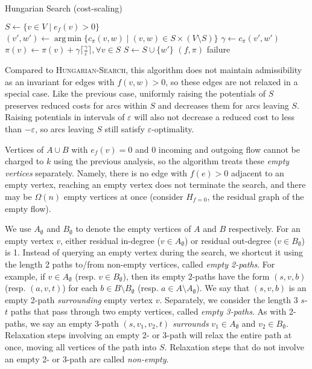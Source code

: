 \documentclass[11pt]{article}
\def\eps{\varepsilon}
\DeclareMathOperator*{\argmin}{arg\,min}
\theoremstyle{plain}
\begin{document}
\begin{algorithm}
\caption{Hungarian Search (cost-scaling)}
\begin{algorithmic}[1]
	\State $S \gets \{v \in V \mid e_f(v) > 0\}$
	\Repeat
		\State $(v', w') \gets \argmin\{c_\pi(v, w) \mid (v, w) \in S \times (V \setminus S)\}$
		\State $\gamma \gets c_\pi(v', w')$
			\State $\pi(v) \gets \pi(v) + \gamma\lceil\frac{\gamma}{\eps}\rceil, \forall v \in S$
		\EndIf
		\State $S \gets S \cup \{w'\}$
		\Statex %
		 
			\State\Return $(f, \pi)$
		\EndIf
	\State\Return failure
\EndFunction
\end{algorithmic}
\end{algorithm}

Compared to \textsc{Hungarian-Search}, this algorithm does not maintain
admissibility as an invariant for edges with $f(v, w) > 0$, so these edges are
not relaxed in a special case.
Like the previous case, uniformly raising the potentials of $S$ preserves
reduced costs for arcs within $S$ and decreases them for arcs leaving $S$.
Raising potentials in intervals of $\eps$ will also not decrease a reduced
cost to less than $-\eps$, so arcs leaving $S$ still satisfy $\eps$-optimality.

Vertices of $A \cup B$ with $e_f(v) = 0$ and 0 incoming and outgoing flow
cannot be charged to $k$ using the previous analysis, so the algorithm treats
these \emph{empty vertices} separately. %
Namely, there is no edge with $f(e) > 0$ adjacent to an empty vertex,
reaching an empty vertex does not terminate the search, and there may be
$\Omega(n)$ empty vertices at once (consider $H_{f = 0}$, the residual graph
of the empty flow).

We use $A_\emptyset$ and $B_\emptyset$ to denote the empty vertices of $A$ and
$B$ respectively.
For an empty vertex $v$, either residual in-degree ($v \in A_\emptyset$) or
residual out-degree ($v \in B_\emptyset$) is 1.
Instead of querying an empty vertex during the search, we shortcut it using the
length 2 paths to/from non-empty vertices, called \emph{empty 2-paths}.
For example, if $v \in A_\emptyset$ (resp. $v \in B_\emptyset$), then its empty
2-paths have the form $(s, v, b)$ (resp. $(a, v, t)$) for each
$b \in B \setminus B_\emptyset$ (resp. $a \in A \setminus A_\emptyset$).
We say that $(s, v, b)$ is an empty 2-path \emph{surrounding} empty vertex $v$.
Separately, we consider the length 3 $s$-$t$ paths that pass through two empty
vertices, called \emph{empty 3-paths}.
As with 2-paths, we say an empty 3-path $(s, v_1, v_2, t)$ \emph{surrounds}
$v_1 \in A_\emptyset$ and $v_2 \in B_\emptyset$.
Relaxation steps involving an empty 2- or 3-path will relax the entire path
at once, moving all vertices of the path into $S$.
Relaxation steps that do not involve an empty 2- or 3-path are called
\emph{non-empty}.
\end{document}
